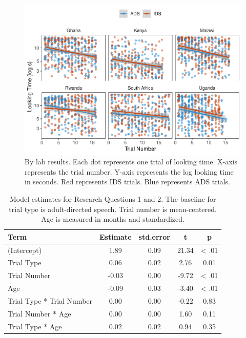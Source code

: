 \documentclass[
  ,man,floatsintext]{apa6}
\begin{document}
\begin{figure}
\centering
\includegraphics{mb1a-paper_files/figure-latex/unnamed-chunk-8-1.pdf}
\caption{\label{fig:unnamed-chunk-8}By lab results. Each dot represents one trial of looking time. X-axis represents the trial number. Y-axis represents the log looking time in seconds. Red represents IDS trials. Blue represents ADS trials.}
\end{figure}

\begin{table}

\caption{Model estimates for Research Questions 1 and 2. The baseline for trial type is adult-directed speech. Trial number is mean-centered. Age is measured in months and standardized.}
\centering
\begin{tabular}[t]{lcccc}
\toprule
Term & Estimate & std.error & t & p\\
\midrule
(Intercept) & 1.89 & 0.09 & 21.34 & < .01\\
Trial Type & 0.06 & 0.02 & 2.76 & 0.01\\
Trial Number & -0.03 & 0.00 & -9.72 & < .01\\
Age & -0.09 & 0.03 & -3.40 & < .01\\
Trial Type * Trial Number & 0.00 & 0.00 & -0.22 & 0.83\\
\addlinespace
Trial Number * Age & 0.00 & 0.00 & 1.60 & 0.11\\
Trial Type * Age & 0.02 & 0.02 & 0.94 & 0.35\\
\bottomrule
\end{tabular}
\end{table}
\end{document}
